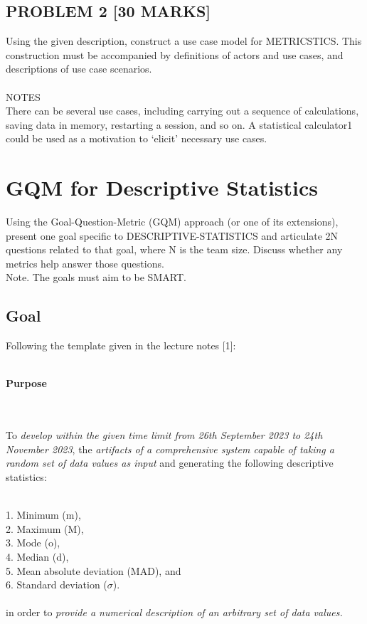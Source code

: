     \subsection*{PROBLEM 2 [30 MARKS]} 
    Using the given description, construct a use case model for METRICSTICS. This construction must be accompanied by definitions of actors and use cases, and descriptions of use case scenarios.
    \\\\
    NOTES
    \\
    There can be several use cases, including carrying out a sequence of calculations, saving data in memory, restarting a session, and so on. A statistical calculator1 could be used as a motivation to `elicit' necessary use cases.

\pagebreak

\section {GQM for Descriptive Statistics}
    Using the Goal-Question-Metric (GQM) approach (or one of its extensions), present one goal specific to DESCRIPTIVE-STATISTICS and articulate 2N questions related to that goal, where N is the team size. Discuss whether any metrics help answer those questions.\\ Note. The goals must aim to be SMART.
  
    \subsection{Goal}
    Following the template given in the lecture notes {[}1{]}:
    
    \strut \\
    \textbf{\large Purpose}
    \strut \\ \\
    To \emph{develop within the given time limit from
    26th September 2023 to 24th
    November 2023}, the \emph{artifacts of a comprehensive system
    capable of taking a random set of data values as input} and
    generating the following descriptive statistics:\\
    \strut \\
    1. Minimum (m),\\
    2. Maximum (M),\\
    3. Mode (o),\\
    4. Median (d),\\
    5. Mean absolute deviation (MAD), and\\
    6. Standard deviation ($\sigma$).\\\\
    in order to \emph{provide a numerical description of an arbitrary
    set of data values.
    }
    
